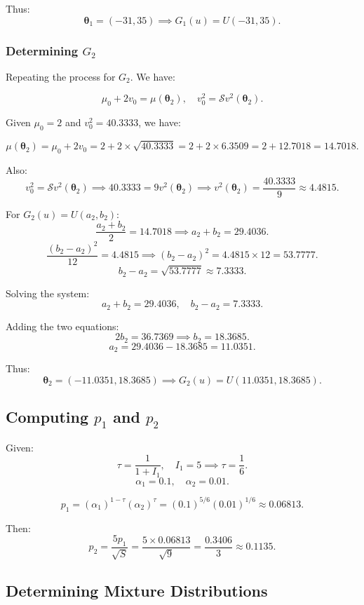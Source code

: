 \documentclass{article}
\begin{document}
Thus:
\[
\boldsymbol\theta_1 = (-31, 35) \implies G_1(u) = U(-31, 35).
\]

\subsubsection{Determining \(G_2\)}

Repeating the process for \(G_2\). We have:

\[
\mu_0 + 2v_0 = \mu(\boldsymbol\theta_2), \quad v_0^2 = \mathcal{S} v^2(\boldsymbol\theta_2).
\]

Given \(\mu_0 = 2\) and \(v_0^2 = 40.3333\), we have:

\[
\mu(\boldsymbol\theta_2) = \mu_0 + 2v_0 = 2 + 2 \times \sqrt{40.3333} = 2 + 2 \times 6.3509 = 2 + 12.7018 = 14.7018.
\]

Also:
\[
v_0^2 = \mathcal{S} v^2(\boldsymbol\theta_2) \implies 40.3333 = 9 v^2(\boldsymbol\theta_2) \implies v^2(\boldsymbol\theta_2) = \frac{40.3333}{9} \approx 4.4815.
\]

For \(G_2(u) = U(a_2, b_2)\):
\[
\frac{a_2 + b_2}{2} = 14.7018 \implies a_2 + b_2 = 29.4036.
\]
\[
\frac{(b_2 - a_2)^2}{12} = 4.4815 \implies (b_2 - a_2)^2 = 4.4815 \times 12 = 53.7777.
\]
\[
b_2 - a_2 = \sqrt{53.7777} \approx 7.3333.
\]

Solving the system:
\[
a_2 + b_2 = 29.4036, \quad b_2 - a_2 = 7.3333.
\]

Adding the two equations:
\[
2b_2 = 36.7369 \implies b_2 = 18.3685.
\]
\[
a_2 = 29.4036 - 18.3685 = 11.0351.
\]

Thus:
\[
\boldsymbol\theta_2 = (-11.0351, 18.3685) \implies G_2(u) = U(11.0351, 18.3685).
\]

\subsection{Computing \( p_1 \) and \( p_2 \)}

Given:
\[
\tau = \frac{1}{1+I_1}, \quad I_1 = 5 \implies \tau = \frac{1}{6}.
\]
\[
\alpha_1 = 0.1, \quad \alpha_2 = 0.01.
\]

\[
p_1 = (\alpha_1)^{1-\tau} (\alpha_2)^\tau = (0.1)^{5/6} (0.01)^{1/6} \approx 0.06813.
\]

Then:
\[
p_2 = \frac{5 p_1}{\sqrt{S}} = \frac{5 \times 0.06813}{\sqrt{9}} = \frac{0.3406}{3} \approx 0.1135.
\]

\subsection{Determining Mixture Distributions}
\end{document}
